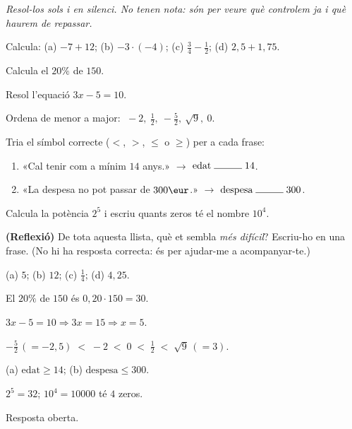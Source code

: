 \noindent\textit{Resol-los sols i en silenci. No tenen nota: són per veure què
controlem ja i què haurem de repassar.}

\begin{exercicis}
\begin{exlist}
  \item Calcula: (a) $-7+12$; \quad (b) $-3\cdot(-4)$; \quad (c) $\tfrac{3}{4}-\tfrac{1}{2}$;
        \quad (d) $2,5+1,75$.
  \item Calcula el $20\%$ de $150$.
  \item Resol l'equació $3x-5=10$.
  \item Ordena de menor a major: $\;-2,\ \tfrac{1}{2},\ -\tfrac{5}{2},\ \sqrt{9},\ 0$.
  \item Tria el símbol correcte ($<$, $>$, $\le$ o $\ge$) per a cada frase:
        \begin{enumerate}[label=\alph*), leftmargin=1.6em, topsep=2pt]
          \item «Cal tenir com a mínim $14$ anys.» $\rightarrow$ $\text{edat}\;\rule{1cm}{0.4pt}\;14$.
          \item «La despesa no pot passar de $300\eur$.» $\rightarrow$ $\text{despesa}\;\rule{1cm}{0.4pt}\;300$.
        \end{enumerate}
  \item Calcula la potència $2^5$ i escriu quants zeros té el nombre $10^4$.
  \item \textbf{(Reflexió)} De tota aquesta llista, què et sembla \emph{més difícil}?
        Escriu-ho en una frase. (No hi ha resposta correcta: és per ajudar-me a
        acompanyar-te.)
\end{exlist}
\end{exercicis}

\begin{solucions}
\begin{sollist}
  \item (a) $5$; \quad (b) $12$; \quad (c) $\tfrac{1}{4}$; \quad (d) $4,25$.
  \item El $20\%$ de $150$ és $0,20\cdot 150=30$.
  \item $3x-5=10 \Rightarrow 3x=15 \Rightarrow x=5$.
  \item $-\tfrac{5}{2}\,(=-2,5) \;<\; -2 \;<\; 0 \;<\; \tfrac{1}{2} \;<\; \sqrt{9}\,(=3)$.
  \item (a) $\text{edat}\ge 14$; \quad (b) $\text{despesa}\le 300$.
  \item $2^5=32$; \quad $10^4=\num{10000}$ té $4$ zeros.
  \item Resposta oberta.
\end{sollist}
\end{solucions}
